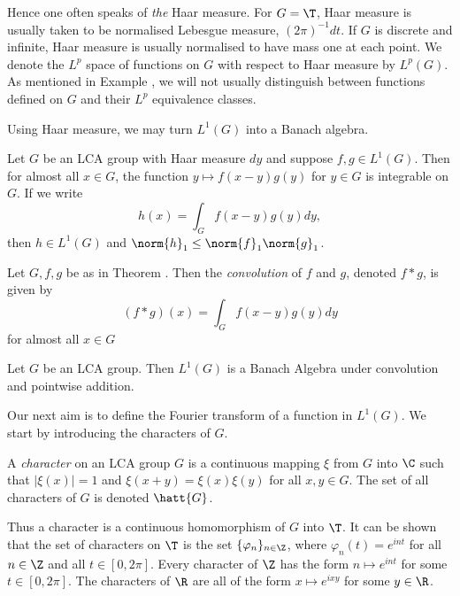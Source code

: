 Hence one often speaks of {\em the} Haar measure. For $G=\T$, Haar measure is
usually taken to be normalised
Lebesgue measure, $(2\pi)^{-1}dt$. If $G$ is discrete and infinite, Haar measure
is usually
normalised to have mass one at each point. We denote the $L^p$ space of
functions on $G$ with respect to Haar measure by $L^p(G)$. As mentioned in
Example , we will not usually distinguish
between functions defined on $G$ and their $L^p$ equivalence classes.

Using Haar measure, we may turn $L^1(G)$ into a Banach algebra.

\begin{theorem}\label{convolution}
Let $G$ be an LCA group with Haar measure $dy$
and suppose $f,g\in L^1(G)$. Then for almost all $x\in G$, the function
$y\mapsto f(x-y)g(y)$ for $y\in G$ is integrable on $G$.
If we write
\[h(x)=\int_G f(x-y)g(y)dy,\]
then $h\in L^1(G)$ and $\norm{h}_1\leq\norm{f}_1\norm{g}_1$.
\end{theorem}

\begin{definition} Let $G,f,g$ be as in Theorem . Then
the {\em convolution} of $f$ and $g$, denoted $f*g$, is given by
\[(f*g)(x)=\int_G f(x-y)g(y)dy\]
for almost all $x\in G$
\end{definition}

\begin{corollary} Let $G$ be an LCA group. Then $L^1(G)$ is a
Banach Algebra under convolution and pointwise addition.
\end{corollary}

Our next aim is to define the Fourier transform of a function in $L^1(G)$.
We start by introducing the characters of $G$.

\begin{definition} A {\em character} on an LCA group $G$ is a continuous mapping
$\xi$ from $G$ into $\C$ such that $|\xi(x)|=1$
and $\xi(x+y)=\xi(x)\xi(y)$ for all $x,y\in G$. The set of all characters of
$G$ is denoted $\hatt{G}$.
\end{definition}

Thus a character is a continuous homomorphism of $G$ into $\T$. It can be shown
that the set of characters on $\T$ is the set $\{\varphi_n\}_{n\in\Z}$, where
$\varphi_n(t)=e^{int}$ for all $n\in\Z$ and all $t\in[0,2\pi]$. Every character
of
$\Z$ has the form $n\mapsto e^{int}$ for some $t\in[0,2\pi]$. The characters of
$\R$ are all of the form $x\mapsto e^{ixy}$ for some $y\in\R$.

